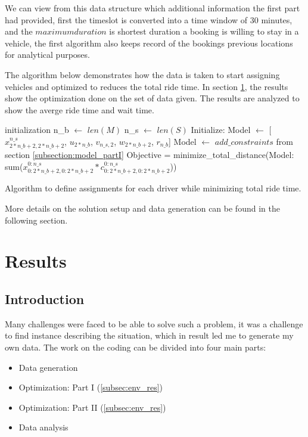 \documentclass{article}
\begin{document}
 We can view from this data structure which additional information the first part had provided, first the timeslot is converted into a time window of $30$ minutes, and the $maximumduration$ is shortest duration a booking is willing to stay in a vehicle, the first algorithm also keeps record of the bookings previous locations for analytical purposes.
 
 The algorithm below demonstrates how the data is taken to start assigning vehicles and optimized to reduces the total ride time. In section \ref{sec:results}, the results show the optimization done on the set of data given. The results are analyzed to show the averge ride time and wait time. 


\begin{algorithm}[H]
\label{alg:darp}
\SetAlgoLined
\LinesNumbered
{}
\BlankLine
 initialization\;
n\_b $\leftarrow$ $len(M)$\;
n\_s $\leftarrow$ $len(S)$\;
Initialize: Model $\leftarrow$ [$x_{2*n\_b+2, 2*n\_b+2}^{n\_s}$, $u_{2*n\_b}$, $v_{n\_s, 2}$, $w_{2*n\_b+2}$, $r_{n\_b}$]\;
Model $\leftarrow$ $add\_constraints$ from section \ref{subsection:model_partI}\;
Objective = minimize\_total\_distance(Model: sum($x_{0:2*n\_b+2,0: 2*n\_b+2}^{0:n\_s}*c_{0:2*n\_b+2,0: 2*n\_b+2}^{0:n\_s}$))\;
 \caption{Algorithm to define assignments for each driver while minimizing total ride time.}
\end{algorithm}

More details on the solution setup and data generation can be found in the following section.


\section{Results}
\label{sec:results}
\subsection{Introduction}
Many challenges were faced to be able to solve such a problem, it was a challenge to find instance describing the situation, which in result led me to generate my own data.
The work on the coding can be divided into four main parts:
\begin{itemize}
\item  Data generation
\item  Optimization: Part I (\ref{subsec:env_res})
\item  Optimization: Part II (\ref{subsec:env_res})
\item Data analysis
\end{itemize}
\end{document}

